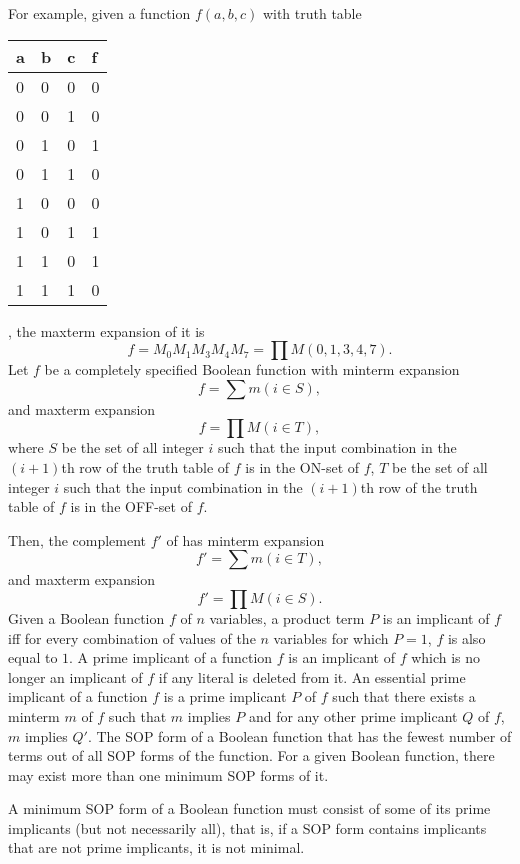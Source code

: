\documentclass[a4paper,12pt]{report}
\begin{document}
\begin{itemize}
\begin{itemize}
\begin{itemize}
\begin{itemize}
\begin{itemize}
\begin{itemize}
\begin{itemize}
\begin{itemize}
For example, given a function $f(a,b,c)$ with truth table
\begin{longtable}[c]{|m|m|m|m|}
\hline
a & b & c & f\\\hline
0 & 0 & 0 & 0\\\hline
0 & 0 & 1 & 0\\\hline
0 & 1 & 0 & 1\\\hline
0 & 1 & 1 & 0\\\hline
1 & 0 & 0 & 0\\\hline
1 & 0 & 1 & 1\\\hline
1 & 1 & 0 & 1\\\hline
1 & 1 & 1 & 0\\\hline
\end{longtable}
, the maxterm expansion of it is
\[f=M_0M_1M_3M_4M_7=\prod M(0,1,3,4,7).\]
Let $f$ be a completely specified Boolean function with minterm expansion
\[f=\sum m(i\in S),\]
and maxterm expansion
\[f=\prod M(i\in T),\]
where $S$ be the set of all integer $i$ such that the input combination in the $(i+1)$th row of the truth table of $f$ is in the ON-set of $f$, $T$ be the set of all integer $i$ such that the input combination in the $(i+1)$th row of the truth table of $f$ is in the OFF-set of $f$.

Then, the complement $f'$ of has minterm expansion 
\[f'=\sum m(i\in T),\]
and maxterm expansion
\[f'=\prod M(i\in S).\]
Given a Boolean function $f$ of $n$ variables, a product term $P$ is an implicant of $f$ iff for every combination of values of the $n$ variables for which $P = 1$, $f$ is also equal to $1$.
A prime implicant of a function $f$ is an implicant of $f$ which is no longer an implicant of $f$ if any literal is deleted from it.
An essential prime implicant of a function $f$ is a prime implicant $P$ of $f$ such that there exists a minterm $m$ of $f$ such that $m$ implies $P$ and for any other prime implicant $Q$ of $f$, $m$ implies $Q'$.
The SOP form of a Boolean function that has the fewest number of terms out of all SOP forms of the function. For a given Boolean function, there may exist more than one minimum SOP forms of it.

A minimum SOP form of a Boolean function must consist of some of its prime implicants (but not necessarily all), that is, if a SOP form contains implicants that are not prime implicants, it is not minimal.


\end{itemize}
\end{itemize}
\end{itemize}
\end{itemize}
\end{itemize}
\end{itemize}
\end{itemize}
\end{itemize}
\end{document}
